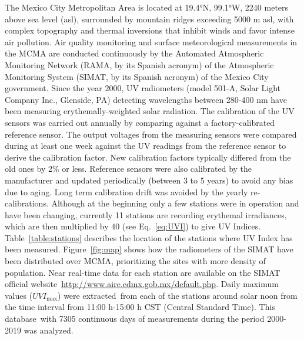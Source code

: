 \documentclass[journal=jacsat,manuscript=article]{achemso}
\begin{document}
The Mexico City Metropolitan Area is located at 19.4°N, 99.1°W, 2240
meters above sea level (asl), surrounded by mountain ridges exceeding
5000 m asl, with complex topography and thermal inversions that inhibit
winds and favor intense air pollution.\citep{Whiteman_2000,Fast_2007,Carre_n_Sierra_2015}
Air quality
monitoring and surface meteorological measurements in the MCMA are
conducted continuously by the Automated Atmospheric Monitoring Network
(RAMA, by its Spanish acronym) of the Atmospheric Monitoring System
(SIMAT, by its Spanish acronym) of the Mexico City government. Since the
year 2000, UV radiometers (model 501-A, Solar Light Company Inc.,
Glenside, PA) detecting wavelengths between 280-400 nm have been
measuring erythemally-weighted solar radiation. The calibration of the
UV sensors was carried out annually by comparing against a
factory-calibrated reference sensor. The output voltages from the
measuring sensors were compared during at least one week against the UV
readings from the reference sensor to derive the calibration factor. New
calibration factors typically differed from the old ones by 2\% or less.
Reference sensors were also calibrated by the manufacturer and updated
periodically (between 3 to 5 years) to avoid any bias due to aging. Long
term calibration drift was avoided by the yearly re-calibrations.
Although at the beginning only a few stations were in operation and have
been changing, currently 11 stations are recording erythemal
irradiances, which are then multiplied by 40 (see
Eq.~{\ref{eq:UVI}}) to give UV Indices.
Table~{\ref{table:stations}} describes the location of
the stations where UV Index has been measured.
Figure~{\ref{fig:map}} shows how the radiometers of the
SIMAT have been distributed over MCMA, prioritizing the sites with more
density of population. Near real-time data for each station are
available on the SIMAT official
website~\url{http://www.aire.cdmx.gob.mx/default.php}. Daily maximum
values (\(UVI_{\max}\)) were extracted~from each of the stations
around solar noon from the time interval from 11:00 h-15:00 h CST
(Central Standard Time). This database~with 7305 continuous days of
measurements during the period 2000-2019 was analyzed.
\end{document}
